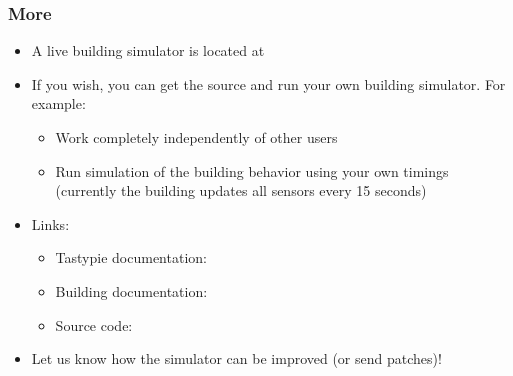 \documentclass[t]{beamer}
\begin{document}
\begin{frame}
  \frametitle{More}
  
  \begin{itemize}
    \item A live building simulator is located at\\
    \item If you wish, you can get the source and run your own building simulator. For example:
      \begin{itemize}
        \item Work completely independently of other users
        \item Run simulation of the building behavior using your own timings (currently the building updates all sensors every 15 seconds)
      \end{itemize}
    \item Links:
    \begin{itemize}
      \item Tastypie documentation: \\
             
      \item Building documentation: \\
      \item Source code:  \\
    \end{itemize}
    \item Let us know how the simulator can be improved (or send patches)!
  \end{itemize}
  
\end{frame}
\end{document}
